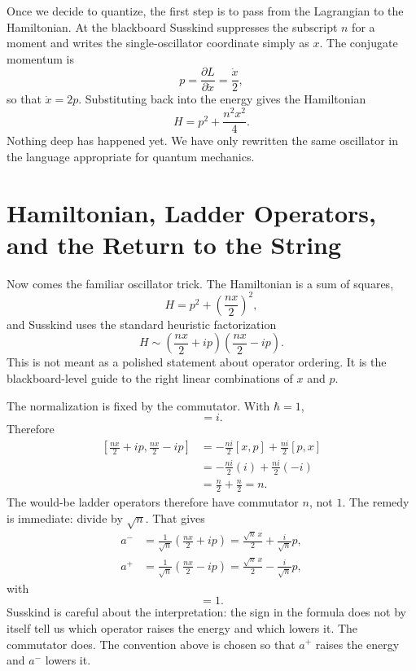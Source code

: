 Once we decide to quantize, the first step is to pass from the Lagrangian to the Hamiltonian. At the blackboard Susskind suppresses the subscript \(n\) for a moment and writes the single-oscillator coordinate simply as \(x\). The conjugate momentum is
\begin{equation}
p=\frac{\partial L}{\partial \dot x}=\frac{\dot x}{2},
\end{equation}
so that \(\dot x=2p\). Substituting back into the energy gives the Hamiltonian
\begin{equation}
H=p^2+\frac{n^2x^2}{4}.
\end{equation}
Nothing deep has happened yet. We have only rewritten the same oscillator in the language appropriate for quantum mechanics.

\section{Hamiltonian, Ladder Operators, and the Return to the String}

Now comes the familiar oscillator trick. The Hamiltonian is a sum of squares,
\begin{equation}
H=p^2+\left(\frac{nx}{2}\right)^2,
\end{equation}
and Susskind uses the standard heuristic factorization
\begin{equation}
H \sim \left(\frac{nx}{2}+ip\right)\left(\frac{nx}{2}-ip\right).
\end{equation}
This is not meant as a polished statement about operator ordering. It is the blackboard-level guide to the right linear combinations of \(x\) and \(p\).

The normalization is fixed by the commutator. With \(\hbar=1\),
\begin{equation}
[x,p]=i.
\end{equation}
Therefore
\begin{align}
\left[\frac{nx}{2}+ip,\frac{nx}{2}-ip\right]
&=
-\frac{ni}{2}[x,p]+\frac{ni}{2}[p,x] \\
&=
-\frac{ni}{2}(i)+\frac{ni}{2}(-i) \\
&= \frac{n}{2}+\frac{n}{2}=n.
\end{align}
The would-be ladder operators therefore have commutator \(n\), not \(1\). The remedy is immediate: divide by \(\sqrt n\). That gives
\begin{align}
a^- &= \frac{1}{\sqrt n}\left(\frac{nx}{2}+ip\right)
= \frac{\sqrt n\,x}{2}+\frac{i}{\sqrt n}p, \\
a^+ &= \frac{1}{\sqrt n}\left(\frac{nx}{2}-ip\right)
= \frac{\sqrt n\,x}{2}-\frac{i}{\sqrt n}p,
\end{align}
with
\begin{equation}
[a^-,a^+]=1.
\end{equation}
Susskind is careful about the interpretation: the sign in the formula does not by itself tell us which operator raises the energy and which lowers it. The commutator does. The convention above is chosen so that \(a^+\) raises the energy and \(a^-\) lowers it.

